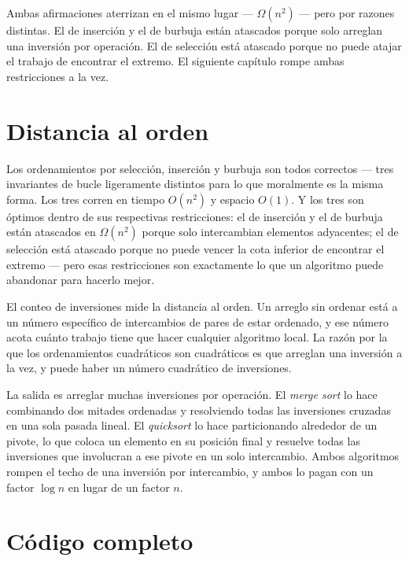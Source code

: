 \documentclass[11pt,a4paper]{article}
\begin{document}
Ambas afirmaciones aterrizan en el mismo lugar --- $\Omega(n^2)$ --- pero por razones distintas. El de inserción y el de burbuja están atascados porque solo arreglan una inversión por operación. El de selección está atascado porque no puede atajar el trabajo de encontrar el extremo. El siguiente capítulo rompe ambas restricciones a la vez.

\section{Distancia al orden}

Los ordenamientos por selección, inserción y burbuja son todos correctos --- tres invariantes de bucle ligeramente distintos para lo que moralmente es la misma forma. Los tres corren en tiempo $O(n^2)$ y espacio $O(1)$. Y los tres son óptimos dentro de sus respectivas restricciones: el de inserción y el de burbuja están atascados en $\Omega(n^2)$ porque solo intercambian elementos adyacentes; el de selección está atascado porque no puede vencer la cota inferior de encontrar el extremo --- pero esas restricciones son exactamente lo que un algoritmo puede abandonar para hacerlo mejor.

El conteo de inversiones mide la distancia al orden. Un arreglo sin ordenar está a un número específico de intercambios de pares de estar ordenado, y ese número acota cuánto trabajo tiene que hacer cualquier algoritmo local. La razón por la que los ordenamientos cuadráticos son cuadráticos es que arreglan una inversión a la vez, y puede haber un número cuadrático de inversiones.

La salida es arreglar muchas inversiones por operación. El \emph{merge sort} lo hace combinando dos mitades ordenadas y resolviendo todas las inversiones cruzadas en una sola pasada lineal. El \emph{quicksort} lo hace particionando alrededor de un pivote, lo que coloca un elemento en su posición final y resuelve todas las inversiones que involucran a ese pivote en un solo intercambio. Ambos algoritmos rompen el techo de una inversión por intercambio, y ambos lo pagan con un factor $\log n$ en lugar de un factor $n$.

\section{Código completo}
\end{document}

